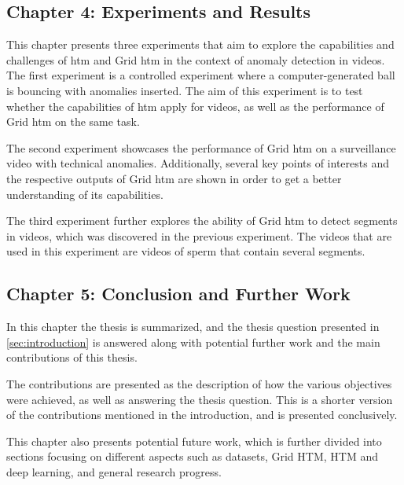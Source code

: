 \subsection*{Chapter 4: Experiments and Results}
This chapter presents three experiments that aim to explore the capabilities and challenges of \gls*{htm} and Grid \gls*{htm} in the context of anomaly detection in videos. The first experiment is a controlled experiment where a computer-generated ball is bouncing with anomalies inserted. The aim of this experiment is to test whether the capabilities of \gls*{htm} apply for videos, as well as the performance of Grid \gls*{htm} on the same task.
\par
The second experiment showcases the performance of Grid \gls*{htm} on a surveillance video with technical anomalies. Additionally, several key points of interests and the respective outputs of Grid \gls*{htm} are shown in order to get a better understanding of its capabilities.
\par
The third experiment further explores the ability of Grid \gls*{htm} to detect segments in videos, which was discovered in the previous experiment. The videos that are used in this experiment are videos of sperm that contain several segments.
\subsection*{Chapter 5: Conclusion and Further Work}
In this chapter the thesis is summarized, and the thesis question presented in \autoref{sec:introduction} is answered along with potential further work and the main contributions of this thesis.
\par
The contributions are presented as the description of how the various objectives were achieved, as well as answering the thesis question. This is a shorter version of the contributions mentioned in the introduction, and is presented conclusively.
\par
This chapter also presents potential future work, which is further divided into sections focusing on different aspects such as datasets, Grid HTM, HTM and deep learning, and general research progress.